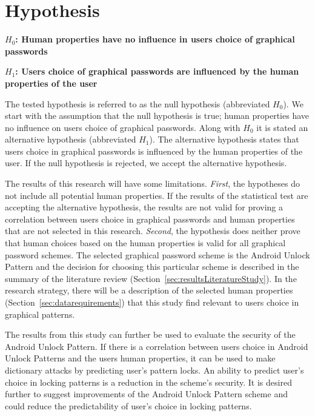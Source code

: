 \section{Hypothesis} \label{sec:hypothesis}
    
  {\bf $H_{0}$: Human properties have no influence in users choice of graphical passwords} 

  {\bf $H_{1}$: Users choice of graphical passwords are influenced by the human properties of the user}

  The tested hypothesis is referred to as the null hypothesis (abbreviated $H_{0}$). We start with the assumption that the null hypothesis is true; human properties have no influence on users choice of graphical passwords. Along with $H_{0}$ it is stated an alternative hypothesis (abbreviated $H_{1}$). The alternative hypothesis states that users choice in graphical passwords is influenced by the human properties of the user. If the null hypothesis is rejected, we accept the alternative hypothesis.

  The results of this research will have some limitations. {\it First}, the hypotheses do not include all potential human properties. If the results of the statistical test are accepting the alternative hypothesis, the results are not valid for proving a correlation between users choice in graphical passwords and human properties that are not selected in this research. 
  {\it Second}, the hypothesis does neither prove that human choices based on the human properties is valid for all graphical password schemes. The selected graphical password scheme is the Android Unlock Pattern and the decision for choosing this particular scheme is described in the summary of the literature review (Section~\ref{sec:resultsLiteratureStudy}). 
  In the research strategy, there will be a description of the selected human properties (Section~\ref{sec:datarequirements}) that this study find relevant to users choice in graphical patterns.
  
  The results from this study can further be used to evaluate the security of the Android Unlock Pattern. If there is a correlation between users choice in Android Unlock Patterns and the users human properties, it can be used to make dictionary attacks by predicting user's pattern locks. An ability to predict user's choice in locking patterns is a reduction in the scheme's security. It is desired further to suggest improvements of the Android Unlock Pattern scheme and could reduce the predictability of user's choice in locking patterns.

